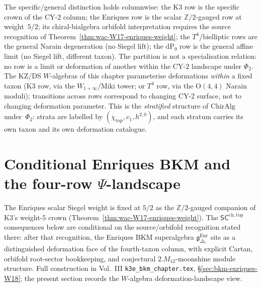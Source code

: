 \begin{remark}
\label{rem:wac-W17-specific-vs-general}
The specific/general distinction holds columnwise:
the K3 row is the specific crown of the CY-$2$ column; the
Enriques row is the scalar $\mathbb{Z}/2$-gauged row at
weight~$5/2$; its chiral-bialgebra orbifold interpretation requires
the source recognition of Theorem~\ref{thm:wac-W17-enriques-weight};
the $T^4$/bielliptic rows are the general Narain
degeneration (no Siegel lift); the $\mathrm{dP}_9$ row is the
general affine limit (no Siegel lift, different taxon). The
partition is not a specialisation relation: no row is a limit
or deformation of another within the CY-$2$ landscape under
$\Phi_2$. The KZ/DS $W$-algebras of this chapter
parameterise deformations \emph{within} a fixed taxon (K3
row, via the $W_{1+\infty}$/Miki tower; or $T^4$ row, via the
$\mathrm{O}(4,4)$ Narain moduli); transitions across rows
correspond to changing CY-$2$ surface, not to changing
deformation parameter. This is the \emph{stratified} structure
of $\mathrm{ChirAlg}$ under~$\Phi_2$: strata are labelled by
$(\chi_{\mathrm{top}}, c_1, h^{2,0})$, and each stratum carries
its own taxon and its own deformation catalogue.
\end{remark}

\section{Conditional Enriques BKM and the four-row $\Psi$-landscape}
\label{sec:wac-supplement-iv}

The Enriques scalar Siegel weight is fixed at $5/2$ as the
$\mathbb{Z}/2$-gauged companion of K3's weight-$5$ crown
(Theorem~\ref{thm:wac-W17-enriques-weight}). The
$\mathsf{SC}^{\mathrm{ch,top}}$ consequences below are conditional on
the source/orbifold recognition stated there: after that recognition,
the Enriques BKM superalgebra
$\mathfrak{g}_{\Delta_5}^{\mathrm{Enr}}$ sits as a distinguished
deformation face of the fourth-taxon column, with explicit Cartan,
orbifold root-sector bookkeeping, and conjectural
$2.M_{12}$-moonshine module structure. Full construction in Vol.~III
\texttt{k3e\_bkm\_chapter.tex},
\S\ref{sec:bkm-enriques-W18}; the present section records the
$W$-algebra deformation-landscape view.

